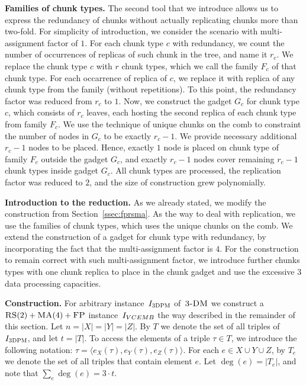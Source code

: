 \textbf{Families of chunk types.} The second tool that we introduce allows us to express the redundancy of chunks without actually replicating chunks more than two-fold.
For simplicity of introduction, we consider the scenario with multi-assignment factor of $1$.
For each chunk type $c$ with redundancy, we count the number of occurrences of replicas of such chunk in the tree, and name it $r_c$.
We replace the chunk type $c$ with $r$ chunk types, which we call the family $F_c$ of that chunk type.
For each occarrence of replica of $c$, we replace it with replica of any chunk type from the family (without repetitions).
To this point, the redundancy factor was reduced from $r_c$ to $1$.
Now, we construct the gadget $G_c$ for chunk type $c$, which consists of $r_c$ leaves, each hosting the second replica of each chunk type from family $F_c$.
We use the technique of unique chunks on the comb to constraint the number of nodes in $G_c$ to be exactly $r_c - 1$.
We provide necessary additional $r_c-1$ nodes to be placed.
Hence, exactly $1$ node is placed on chunk type of family $F_c$ outside the gadget $G_c$, and exactly $r_c-1$ nodes cover remaining $r_c-1$ chunk types inside gadget $G_c$.
All chunk types are processed, the replication factor was reduced to $2$, and the size of construction grew polynomially.

\textbf{Introduction to the reduction.} As we already stated, we modify the construction from Section~\ref{ssec:fprsma}.
As the way to deal with replication, we use the families of chunk types, which uses the unique chunks on the comb.
We extend the construction of a gadget for chunk type with redundancy, by incorporating the fact that the multi-assignment factor is $4$.
For the construction to remain correct with such multi-assignment factor, we introduce further chunks types with one chunk replica to place in the chunk gadget and use the excessive $3$ data processing capacities.

\textbf{Construction.}
For arbitrary instance~$I_{\textsc{3DPM}}$ of~$\textsc{3-DM}$ we construct a~$\textsc{RS}(2)+\textsc{MA}(4)+\textsc{FP}$ instance~$I_{VCEMB}$ the way described in the remainder of this section.
Let $n = |X|=|Y|=|Z|$.
By $T$ we denote the set of all triples of $I_{\textsc{3DPM}}$, and let $t = |T|$.
To access the elements of a triple $\tau \in T$, we introduce the following notation: $\tau = \langle e_X(\tau), e_Y(\tau), e_Z(\tau) \rangle$.
For each $e\in X\cup Y\cup Z$, by $T_e$ we denote the set of all triples that contain element $e$.
Let $\deg(e) = |T_e|$, and note that $\sum_e \deg(e) = 3\cdot t$.

